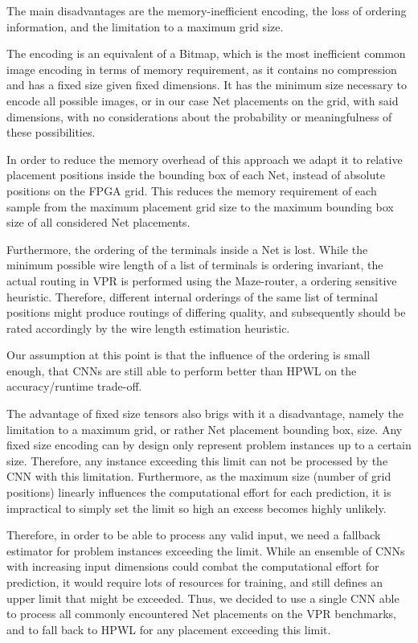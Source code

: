 The main disadvantages are the memory-inefficient encoding, the loss of ordering information, and the limitation to a maximum grid size.

The encoding is an equivalent of a Bitmap, which is the most inefficient common image encoding in terms of memory requirement, as it contains no compression and has a fixed size given fixed dimensions. It has the minimum size necessary to encode all possible images, or in our case Net placements on the grid, with said dimensions, with no considerations about the probability or meaningfulness of these possibilities.

In order to reduce the memory overhead of this approach we adapt it to relative placement positions inside the bounding box of each Net, instead of absolute positions on the \gls{FPGA} grid. This reduces the memory requirement of each sample from the maximum placement grid size to the maximum bounding box size of all considered Net placements.

Furthermore, the ordering of the terminals inside a Net is lost. While the minimum possible wire length of a list of terminals is ordering invariant, the actual routing in \gls{VPR} is performed using the Maze-router, a ordering sensitive heuristic. Therefore, different internal orderings of the same list of terminal positions might produce routings of differing quality, and subsequently should be rated accordingly by the wire length estimation heuristic.

Our assumption at this point is that the influence of the ordering is small enough, that \glspl{CNN} are still able to perform better than \gls{HPWL} on the accuracy/runtime trade-off.

The advantage of fixed size tensors also brigs with it a disadvantage, namely the limitation to a maximum grid, or rather Net placement bounding box, size. Any fixed size encoding can by design only represent problem instances up to a certain size. Therefore, any instance exceeding this limit can not be processed by the \gls{CNN} with this limitation. Furthermore, as the maximum size (number of grid positions) linearly influences the computational effort for each prediction, it is impractical to simply set the limit so high an excess becomes highly unlikely.

Therefore, in order to be able to process any valid input, we need a fallback estimator for problem instances exceeding the limit. While an ensemble of \glspl{CNN} with increasing input dimensions could combat the computational effort for prediction, it would require lots of resources for training, and still defines an upper limit that might be exceeded. Thus, we decided to use a single \gls{CNN} able to process all commonly encountered Net placements on the \gls{VPR} benchmarks, and to fall back to \gls{HPWL} for any placement exceeding this limit.

